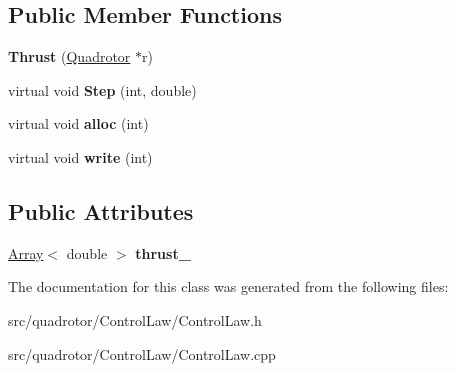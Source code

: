 \subsection*{\-Public \-Member \-Functions}
\begin{DoxyCompactItemize}
\item 
\hypertarget{classCL_1_1Thrust_ab343e53d462e46abc4557aac63e1f2ce}{{\bfseries \-Thrust} (\hyperlink{classQuadrotor}{\-Quadrotor} $\ast$r)}\label{classCL_1_1Thrust_ab343e53d462e46abc4557aac63e1f2ce}

\item 
\hypertarget{classCL_1_1Thrust_ae30505836a5b53f0611364d9454d8c92}{virtual void {\bfseries \-Step} (int, double)}\label{classCL_1_1Thrust_ae30505836a5b53f0611364d9454d8c92}

\item 
\hypertarget{classCL_1_1Thrust_acf63aa8e59ca8c1e8a0741d4446a0b05}{virtual void {\bfseries alloc} (int)}\label{classCL_1_1Thrust_acf63aa8e59ca8c1e8a0741d4446a0b05}

\item 
\hypertarget{classCL_1_1Thrust_a91f80ba432e0e495a6c88613dd34ee2c}{virtual void {\bfseries write} (int)}\label{classCL_1_1Thrust_a91f80ba432e0e495a6c88613dd34ee2c}

\end{DoxyCompactItemize}
\subsection*{\-Public \-Attributes}
\begin{DoxyCompactItemize}
\item 
\hypertarget{classCL_1_1Thrust_af4783ea1e392716df3866ec1867ee25f}{\hyperlink{classArray}{\-Array}$<$ double $>$ {\bfseries thrust\-\_\-}}\label{classCL_1_1Thrust_af4783ea1e392716df3866ec1867ee25f}

\end{DoxyCompactItemize}


\-The documentation for this class was generated from the following files\-:\begin{DoxyCompactItemize}
\item 
src/quadrotor/\-Control\-Law/\-Control\-Law.\-h\item 
src/quadrotor/\-Control\-Law/\-Control\-Law.\-cpp\end{DoxyCompactItemize}
